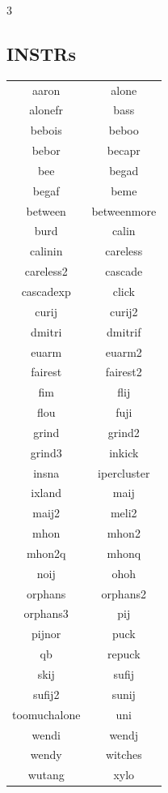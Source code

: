 \documentclass[a4paper, landscape]{book}
\begin{document}
\begin{multicols}{3}
\begin{center} \section*{INSTRs}

\begin{tabular}{ c|c } 
aaron & alone \\
alonefr & bass \\
bebois & beboo \\
bebor & becapr \\
bee & begad \\
begaf & beme \\
between & betweenmore \\
burd & calin \\
calinin & careless \\
careless2 & cascade \\
cascadexp & click \\
curij & curij2 \\
dmitri & dmitrif \\
euarm & euarm2 \\
fairest & fairest2 \\
fim & flij \\
flou & fuji \\
grind & grind2 \\
grind3 & inkick \\
insna & ipercluster \\
ixland & maij \\
maij2 & meli2 \\
mhon & mhon2 \\
mhon2q & mhonq \\
noij & ohoh \\
orphans & orphans2 \\
orphans3 & pij \\
pijnor & puck \\
qb & repuck \\
skij & sufij \\
sufij2 & sunij \\
toomuchalone & uni \\
wendi & wendj \\
wendy & witches \\
wutang & xylo \\

\end{tabular}
\end{center}
\columnbreak


\end{multicols}
\end{document}
